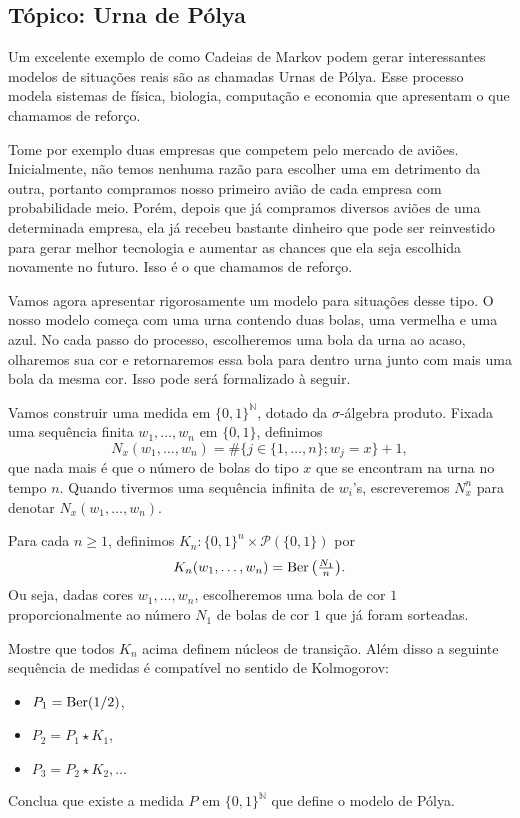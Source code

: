 \begin{topics}

\section{Tópico: Urna de Pólya}
\label{s:urna_polya}

Um excelente exemplo de como Cadeias de Markov podem gerar interessantes modelos de situações reais são as chamadas Urnas de Pólya.
Esse processo modela sistemas de física, biologia, computação e economia que apresentam o que chamamos de reforço.

Tome por exemplo duas empresas que competem pelo mercado de aviões.
Inicialmente, não temos nenhuma razão para escolher uma em detrimento da outra, portanto compramos nosso primeiro avião de cada empresa com probabilidade meio.
Porém, depois que já compramos diversos aviões de uma determinada empresa, ela já recebeu bastante dinheiro que pode ser reinvestido para gerar melhor tecnologia e aumentar as chances que ela seja escolhida novamente no futuro.
Isso é o que chamamos de reforço.

Vamos agora apresentar rigorosamente um modelo para situações desse tipo.
O nosso modelo começa com uma urna contendo duas bolas, uma vermelha e uma azul.
No cada passo do processo, escolheremos uma bola da urna ao acaso, olharemos sua cor e retornaremos essa bola para dentro urna junto com mais uma bola da mesma cor.
Isso pode será formalizado à seguir.

Vamos construir uma medida em $\{0, 1\}^\mathbb{N}$, dotado da $\sigma$-álgebra produto.
Fixada uma sequência finita $w_1, \dots, w_n$ em $\{0,1\}$, definimos
\begin{equation}
  N_x (w_1, \dots, w_n) = \# \big\{ j \in \{1, \dots, n\}; w_j = x \big\} + 1,
\end{equation}
que nada mais é que o número de bolas do tipo $x$ que se encontram na urna no tempo $n$.
Quando tivermos uma sequência infinita de $w_i$'s, escreveremos $N^n_x$ para denotar $N_x(w_1, \dots, w_n)$.

Para cada $n \geq 1$, definimos $K_n:\{0,1\}^n \times \mathcal{P}(\{0,1\})$ por
\begin{equation}
  K_n(w_1, \dots, w_n) = \operatorname{Ber}\big( \tfrac{N_1}{n} \big).
\end{equation}
Ou seja, dadas cores $w_1, \dots, w_n$, escolheremos uma bola de cor $1$ proporcionalmente ao número $N_1$ de bolas de cor $1$ que já foram sorteadas.

\begin{exercise}
  \label{x:constr_Polya}
  Mostre que todos $K_n$ acima definem núcleos de transição.
  Além disso a seguinte sequência de medidas é compatível no sentido de Kolmogorov:
  \begin{itemize}
  \item $P_1 = \operatorname{Ber}(1/2)$,
  \item $P_2 = P_1 \star K_1$,
  \item $P_3 = P_2 \star K_2, \dots$
  \end{itemize}
  Conclua que existe a medida $P$ em $\{0,1\}^\mathbb{N}$ que define o modelo de Pólya.
\end{exercise}


\end{topics}

